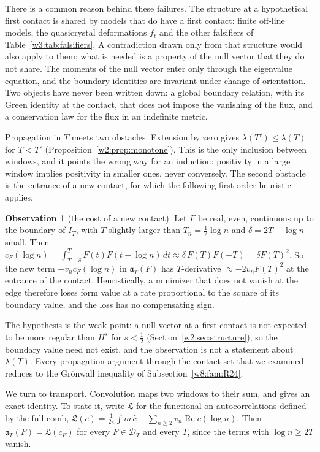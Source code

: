 \documentclass[11pt]{amsart}
\theoremstyle{definition}
\newtheorem{observation}[theorem]{Observation}
\theoremstyle{remark}
\numberwithin{equation}{section}
\DeclareMathOperator{\Rel}{Re}
\newcommand{\IT}{I_T}                                  %
\newcommand{\cF}{c_F}                                  %
\newcommand{\DT}{\mathcal{D}_T}                        %
\newcommand{\aT}{\mathfrak{a}_T}                       %
\newcommand{\lam}{\lambda(T)}                          %
\begin{document}
There is a common reason behind these failures. The structure at a hypothetical first contact is shared by
models that do have a first contact: finite off-line models, the quasicrystal deformations $f_t$ and the other
falsifiers of Table~\ref{w3:tab:falsifiers}. A contradiction drawn only from that structure would also apply to
them; what is needed is a property of the null vector that they do not share. The moments of the null vector
enter only through the eigenvalue equation, and the boundary identities are invariant under change of
orientation. Two objects have never been written down: a global boundary relation, with its Green identity at
the contact, that does not impose the vanishing of the flux, and a conservation law for the flux in an
indefinite metric.

Propagation in $T$ meets two obstacles. Extension by zero gives $\lambda(T')\le\lambda(T)$ for $T<T'$
(Proposition~\ref{w2:prop:monotone}). This is the only inclusion between windows, and it points the wrong way
for an induction: positivity in a large window implies positivity in smaller ones, never conversely. The second
obstacle is the entrance of a new contact, for which the following first-order heuristic applies.

\begin{observation}[the cost of a new contact]\label{w8:obs:jump}
Let $F$ be real, even, continuous up to the boundary of $\IT$, with $T$ slightly larger than $T_n=\frac12\log n$ and
$\delta=2T-\log n$ small. Then $\cF(\log n)=\int_{T-\delta}^{T}F(t)F(t-\log n)\,dt\approx\delta\,F(T)F(-T)=\delta F(T)^2$.
So the new term $-v_n\cF(\log n)$ in $\aT(F)$ has $T$-derivative $\approx-2v_nF(T)^2$ at the entrance of the contact.
Heuristically, a minimizer that does not vanish at the edge therefore loses form value at a rate proportional to
the square of its boundary value, and the loss has no compensating sign.
\end{observation}

The hypothesis is the weak point: a null vector at a first contact is not expected to be more regular than
$H^s$ for $s<\frac12$ (Section~\ref{w2:sec:structure}), so the boundary value need not exist, and the
observation is not a statement about $\lam$. Every propagation argument through the contact set that we examined
reduces to the Gr\"onwall inequality of Subsection~\ref{w8:fam:R24}.

We turn to transport. Convolution maps two windows to their sum, and gives an exact identity. To state it, write
$\mathfrak L$ for the functional on autocorrelations defined by the full comb,
$\mathfrak L(c)=\frac1{2\pi}\int m\,\widehat c-\sum_{n\ge2}v_n\Rel c(\log n)$. Then $\aT(F)=\mathfrak L(\cF)$ for
every $F\in\DT$ and every $T$, since the terms with $\log n\ge2T$ vanish.
\end{document}
